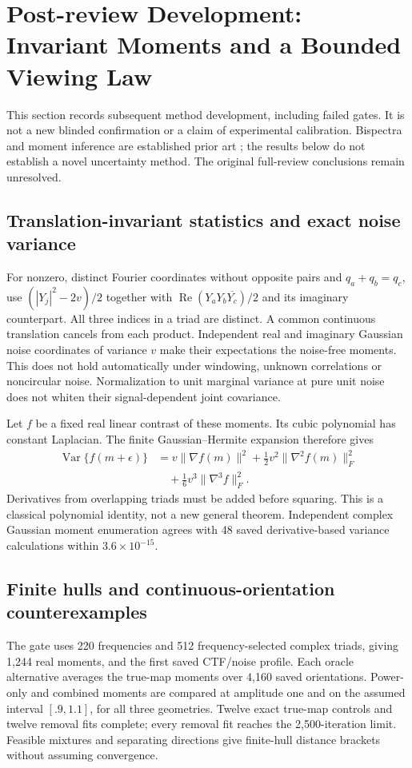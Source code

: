 \section{Post-review Development: Invariant Moments and a Bounded Viewing Law}
\label{app:momentdevelopment}
This section records subsequent method development, including failed gates.
It is not a new blinded confirmation or a claim of experimental calibration.
Bispectra and moment inference are established prior art
\citep{perry2019mra,janson2026mps}; the results below do not establish a novel
uncertainty method. The original full-review conclusions remain unresolved.

\subsection{Translation-invariant statistics and exact noise variance}
For nonzero, distinct Fourier coordinates without opposite pairs and
$q_a+q_b=q_c$, use $(|Y_j|^2-2v)/2$ together with
$\operatorname{Re}(Y_aY_b\overline{Y_c})/2$ and its imaginary counterpart.
All three indices in a triad are distinct. A common continuous translation
cancels from each product. Independent real and imaginary Gaussian noise
coordinates of variance $v$ make their expectations the noise-free moments.
This does not hold automatically under windowing, unknown correlations or
noncircular noise. Normalization to unit marginal variance at pure unit noise
does not whiten their signal-dependent joint covariance.

Let $f$ be a fixed real linear contrast of these moments. Its cubic polynomial
has constant Laplacian. The finite Gaussian--Hermite expansion therefore gives
\begin{align*}
\operatorname{Var}\{f(m+\epsilon)\}
&=v\|\nabla f(m)\|^2+\tfrac12v^2\|\nabla^2 f(m)\|_F^2\\
&\quad+\tfrac16v^3\|\nabla^3 f\|_F^2.
\end{align*}
Derivatives from overlapping triads must be added before squaring. This is a
classical polynomial identity, not a new general theorem. Independent complex
Gaussian moment enumeration agrees with 48 saved derivative-based variance
calculations within $3.6\times10^{-15}$.



\subsection{Finite hulls and continuous-orientation counterexamples}
The gate uses 220 frequencies and 512 frequency-selected complex triads,
giving 1,244 real moments, and the first saved CTF/noise profile. Each oracle
alternative averages the true-map moments over 4,160 saved orientations.
Power-only and combined moments are compared at amplitude one and on the
assumed interval $[.9,1.1]$, for all three geometries. Twelve exact true-map
controls and twelve removal fits complete; every removal fit reaches the
2,500-iteration limit. Feasible mixtures and separating directions give
finite-hull distance brackets without assuming convergence.

